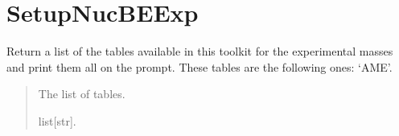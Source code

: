 \documentclass[letterpaper,10pt,english]{sphinxmanual}
\begin{document}
\sphinxstepscope


\section{SetupNucBEExp}
\label{\detokenize{source/api/setup_nuc_be_exp:setupnucbeexp}}\label{\detokenize{source/api/setup_nuc_be_exp::doc}}\label{\detokenize{source/api/setup_nuc_be_exp:module-nucleardatapy.nuc.setup_be_exp}}

\begin{fulllineitems}
\label{\detokenize{source/api/setup_nuc_be_exp:nucleardatapy.nuc.setup_be_exp.be_exp_tables}}
\pysigstartsignatures
{}
\pysigstopsignatures
\sphinxAtStartPar
Return a list of the tables available in this toolkit for the experimental masses and
print them all on the prompt. These tables are the following
ones: ‘AME’.
\begin{quote}\begin{description}
\sphinxAtStartPar
The list of tables.

\sphinxAtStartPar
list{[}str{]}.

\end{description}\end{quote}

\end{fulllineitems}

\end{document}
